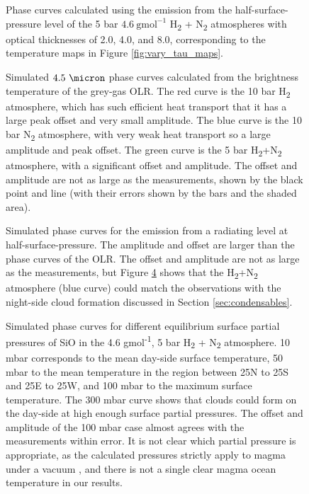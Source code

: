 \begin{figure}
\caption{Phase curves calculated using the emission from the half-surface-pressure level of the 5 bar $4.6\ \mathrm{gmol}^{-1}$ H\textsubscript{2} + N\textsubscript{2} atmospheres with optical thicknesses of 2.0, 4.0, and 8.0, corresponding to the temperature maps in Figure \ref{fig:vary_tau_maps}.\label{fig:phasecurves_tauinf}}
\end{figure}



\begin{figure}
\caption{Simulated $4.5\ \micron$ phase curves calculated from the brightness temperature of the grey-gas OLR. The red curve is the 10 bar H\textsubscript{2} atmosphere, which has such efficient heat transport that it has a large peak offset and very small amplitude. The blue curve is the 10 bar N\textsubscript{2} atmosphere, with very weak heat transport so a large amplitude and peak offset. The green curve is the 5 bar H\textsubscript{2}+N\textsubscript{2} atmosphere, with a significant offset and amplitude. The offset and amplitude are not as large as the \citet{demory2016map} measurements, shown by the black point and line (with their errors shown by the bars and the shaded area).\label{fig:phasecurves_flux}}
\end{figure}

\begin{figure}
\caption{Simulated phase curves for the emission from a radiating level at half-surface-pressure. The amplitude and offset are larger than the phase curves of the OLR. The offset and amplitude are not as large as the \citet{demory2016map} measurements, but Figure \ref{fig:phasecurves_clouds} shows that the H\textsubscript{2}+N\textsubscript{2} atmosphere (blue curve) could match the observations with the night-side cloud formation discussed in Section \ref{sec:condensables}.\label{fig:phasecurves_temp}}
\end{figure}


\begin{figure}
\caption{Simulated phase curves for different equilibrium surface partial pressures of SiO in the 4.6 gmol\textsuperscript{-1}, 5 bar H\textsubscript{2} + N\textsubscript{2} atmosphere. 10 mbar corresponds to the mean day-side surface temperature, 50 mbar to the mean temperature in the region between 25N to 25S and 25E to 25W, and 100 mbar to the maximum surface temperature. The 300 mbar curve shows that clouds could form on the day-side at high enough surface partial pressures.  The offset and amplitude of the 100 mbar case almost agrees with the \citet{demory2016map} measurements within error. It is not clear which partial pressure is appropriate, as the calculated pressures strictly apply to magma under a vacuum \citep{miguel2011compositions}, and there is not a single clear magma ocean temperature in our results. \label{fig:phasecurves_clouds}}
\end{figure}

